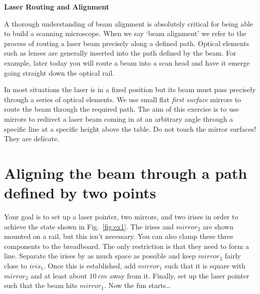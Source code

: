 \documentclass[a4paper]{report}
\begin{document}
\setcounter{secnumdepth}{2}

\begin{center}
\textbf{\Large{Laser Routing and Alignment}}
\end{center}

A thorough understanding of beam alignment is absolutely critical for being able to build a scanning microscope. 
When we say `beam alignment' we refer to the process of routing a laser beam precisely along a defined path. 
Optical elements such as lenses are generally inserted into the path defined by the beam. 
For example, later today you will route a beam into a scan head and have it emerge going straight down the optical rail.

In most situations the laser is in a fixed position but its beam must pass precisely through a series of optical elements. 
We use small flat \textit{first surface} mirrors to route the beam through the required path. 
The aim of this exercise is to use mirrors to redirect a laser beam coming in at an arbitrary angle through a specific line at a specific height above the table.
Do not touch the mirror surfaces! 
They are delicate.


\section{Aligning the beam through a path defined by two points}
Your goal is to set up a laser pointer, two mirrors, and two irises in order to achieve the state shown in Fig.~\ref{fig:ex1}. 
The irises and $mirror_2$ are shown mounted on a rail, but this isn't necessary. 
You can also clamp these three components to the breadboard.
The only restriction is that they need to form a line. 
Separate the irises by as much space as possible and keep $mirror_2$ fairly close to $iris_1$.
Once this is established, add $mirror_1$ such that it is square with $mirror_2$ and at least about $10~cm$ away from it. 
Finally, set up the laser pointer such that the beam hits $mirror_1$.
Now the fun starts\ldots
\end{document}
